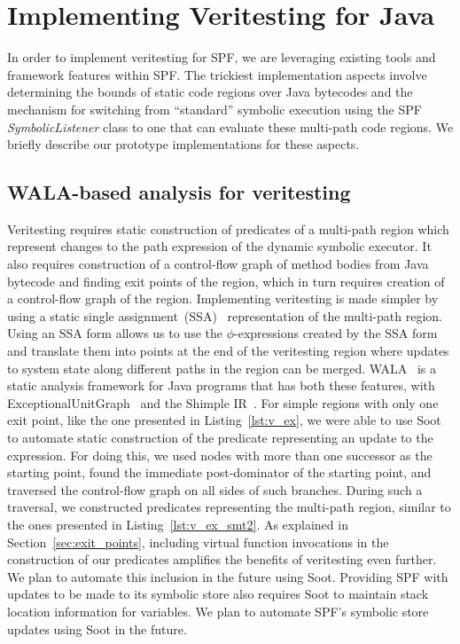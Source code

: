 \section{Implementing Veritesting for Java}
In order to implement veritesting for SPF, we are leveraging existing tools and framework features within SPF.  The trickiest implementation aspects involve determining the bounds of static code regions over Java bytecodes and the mechanism for switching from ``standard'' symbolic execution using the SPF {\em SymbolicListener} class to one that can evaluate these multi-path code regions. We briefly describe our prototype implementations for these aspects.
%
\subsection{WALA-based analysis for veritesting}
%
Veritesting requires static construction of
predicates of a multi-path region which represent changes to the path expression of the dynamic
symbolic executor.
%
It also requires construction of a control-flow graph of method bodies
from Java bytecode and finding exit points of the region, which in turn
requires creation of a control-flow graph of the region.
%
Implementing veritesting is made simpler by using a static single
assignment~(SSA)~\cite{ssa} representation of the multi-path region.
%
Using an SSA form allows us to use the $\phi$-expressions created by the
SSA form and translate them into points at the end of the veritesting
region where updates to system state along different paths in the region
can be merged.
%
WALA~\cite{} is a static analysis framework for Java programs that
has both these features, with
ExceptionalUnitGraph~\cite{exceptionalunitgraph} and the Shimple
IR~\cite{shimple}.
%
For simple regions with only one exit point, like the one presented in Listing~\ref{lst:v_ex}, we
were able to use Soot to automate static construction of the predicate representing
an update to the expression.
%
For doing this, we used nodes with more than one successor as the
starting point, found the immediate post-dominator of the starting
point, and traversed the control-flow graph on all sides of such branches.
%
During such a traversal, we constructed predicates representing the
multi-path region, similar to the ones presented in
Listing~\ref{lst:v_ex_smt2}.
%
As explained in Section~\ref{sec:exit_points}, including virtual
function invocations in the construction of our predicates amplifies the
benefits of veritesting even further.
%
We plan to automate this inclusion in the future using Soot.
%
Providing SPF with updates to be made to its symbolic store also
requires Soot to maintain stack location information for variables.
%
We plan to automate SPF\rq s symbolic store updates using Soot in the
future.
%
